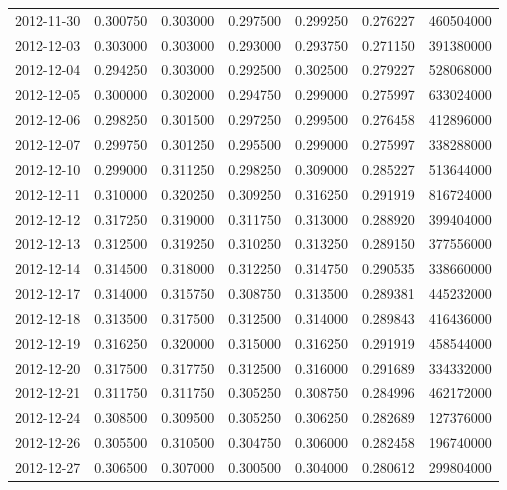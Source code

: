 \begin{tabular}{lrrrrrr}
2012-11-30 &    0.300750 &    0.303000 &    0.297500 &    0.299250 &    0.276227 &   460504000 \\
2012-12-03 &    0.303000 &    0.303000 &    0.293000 &    0.293750 &    0.271150 &   391380000 \\
2012-12-04 &    0.294250 &    0.303000 &    0.292500 &    0.302500 &    0.279227 &   528068000 \\
2012-12-05 &    0.300000 &    0.302000 &    0.294750 &    0.299000 &    0.275997 &   633024000 \\
2012-12-06 &    0.298250 &    0.301500 &    0.297250 &    0.299500 &    0.276458 &   412896000 \\
2012-12-07 &    0.299750 &    0.301250 &    0.295500 &    0.299000 &    0.275997 &   338288000 \\
2012-12-10 &    0.299000 &    0.311250 &    0.298250 &    0.309000 &    0.285227 &   513644000 \\
2012-12-11 &    0.310000 &    0.320250 &    0.309250 &    0.316250 &    0.291919 &   816724000 \\
2012-12-12 &    0.317250 &    0.319000 &    0.311750 &    0.313000 &    0.288920 &   399404000 \\
2012-12-13 &    0.312500 &    0.319250 &    0.310250 &    0.313250 &    0.289150 &   377556000 \\
2012-12-14 &    0.314500 &    0.318000 &    0.312250 &    0.314750 &    0.290535 &   338660000 \\
2012-12-17 &    0.314000 &    0.315750 &    0.308750 &    0.313500 &    0.289381 &   445232000 \\
2012-12-18 &    0.313500 &    0.317500 &    0.312500 &    0.314000 &    0.289843 &   416436000 \\
2012-12-19 &    0.316250 &    0.320000 &    0.315000 &    0.316250 &    0.291919 &   458544000 \\
2012-12-20 &    0.317500 &    0.317750 &    0.312500 &    0.316000 &    0.291689 &   334332000 \\
2012-12-21 &    0.311750 &    0.311750 &    0.305250 &    0.308750 &    0.284996 &   462172000 \\
2012-12-24 &    0.308500 &    0.309500 &    0.305250 &    0.306250 &    0.282689 &   127376000 \\
2012-12-26 &    0.305500 &    0.310500 &    0.304750 &    0.306000 &    0.282458 &   196740000 \\
2012-12-27 &    0.306500 &    0.307000 &    0.300500 &    0.304000 &    0.280612 &   299804000 \\

\end{tabular}
